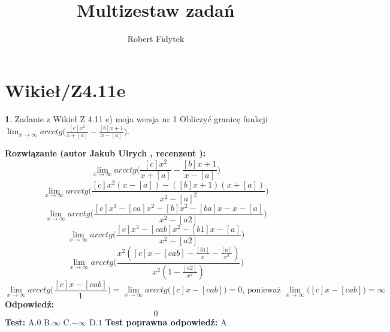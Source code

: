\documentclass[12pt, a4paper]{article}
\title{Multizestaw zadań}
\author{Robert Fidytek}
\date{}
\theoremstyle{definition} %
\newtheorem{zad}{}
\newcommand{\kategoria}[1]{\section{#1}} %
\newcommand{\zadStart}[1]{\begin{zad}#1\newline} %
\newcommand{\zadStop}{\end{zad}}   %
\newcommand{\rozwStart}[2]{\noindent \textbf{Rozwiązanie (autor #1 , recenzent #2): }\newline} %
\newcommand{\rozwStop}{\newline}                                            %
\newcommand{\odpStart}{\noindent \textbf{Odpowiedź:}\newline}    %
\newcommand{\odpStop}{\newline}                                             %
\newcommand{\testStart}{\noindent \textbf{Test:}\newline} %
\newcommand{\testStop}{\newline} %
\newcommand{\kluczStart}{\noindent \textbf{Test poprawna odpowiedź:}\newline} %
\newcommand{\kluczStop}{\newline} %
\begin{document}
\maketitle


\kategoria{Wikieł/Z4.11e}
\zadStart{Zadanie z Wikieł Z 4.11 e) moja wersja nr 1}
Obliczyć granicę funkcji $\lim_{x \to \infty}arcctg\big(\frac{[c]x^{2}}{x+[a]}-\frac{[b]x+1}{x-[a]}\big)$.
\zadStop
\rozwStart{Jakub Ulrych}{}
$$\lim_{x \to \infty}arcctg\bigg(\frac{[c]x^{2}}{x+[a]}-\frac{[b]x+1}{x-[a]}\bigg)$$
$$\lim_{x \to \infty}arcctg\bigg(\frac{[c]x^{2}(x-[a])-([b]x+1)(x+[a])}{x^{2}-[a]^{2}}\bigg)$$
$$\lim_{x \to \infty}arcctg\bigg(\frac{[c]x^{3}-[ca]x^{2}-[b]x^{2}-[ba]x-x-[a]}{x^{2}-[a2]}\bigg)$$
$$\lim_{x \to \infty}arcctg\bigg(\frac{[c]x^{3}-[cab]x^{2}-[b1]x-[a]}{x^{2}-[a2]}\bigg)$$
$$\lim_{x \to \infty}arcctg\bigg(\frac{x^{2}([c]x-[cab]-\frac{[b1]}{x}-\frac{[a]}{x^{2}})}{x^{2}(1-\frac{[a2]}{x^{2}})}\bigg)$$
$$\lim_{x \to \infty}arcctg\bigg(\frac{[c]x-[cab]}{1}\bigg)=\lim_{x \to \infty}arcctg\bigg([c]x-[cab]\bigg)=0\text{, ponieważ }\lim_{x \to \infty}\bigg([c]x-[cab]\bigg)=\infty$$
\rozwStop
\odpStart
$$0$$
\odpStop
\testStart
A.$0$
B.$\infty$
C.$-\infty$
D.$1$
\testStop
\kluczStart
A
\kluczStop
\end{document}
